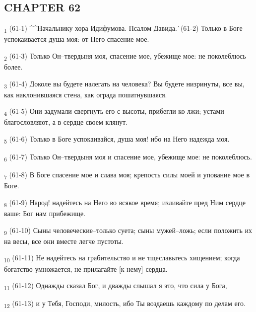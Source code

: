 \subsection{CHAPTER 62}
\begin{tcolorbox}
\textsubscript{1} (61-1) ^^Начальнику хора Идифумова. Псалом Давида.^^ (61-2) Только в Боге успокаивается душа моя: от Него спасение мое.
\end{tcolorbox}
\begin{tcolorbox}
\textsubscript{2} (61-3) Только Он--твердыня моя, спасение мое, убежище мое: не поколеблюсь более.
\end{tcolorbox}
\begin{tcolorbox}
\textsubscript{3} (61-4) Доколе вы будете налегать на человека? Вы будете низринуты, все вы, как наклонившаяся стена, как ограда пошатнувшаяся.
\end{tcolorbox}
\begin{tcolorbox}
\textsubscript{4} (61-5) Они задумали свергнуть его с высоты, прибегли ко лжи; устами благословляют, а в сердце своем клянут.
\end{tcolorbox}
\begin{tcolorbox}
\textsubscript{5} (61-6) Только в Боге успокаивайся, душа моя! ибо на Него надежда моя.
\end{tcolorbox}
\begin{tcolorbox}
\textsubscript{6} (61-7) Только Он--твердыня моя и спасение мое, убежище мое: не поколеблюсь.
\end{tcolorbox}
\begin{tcolorbox}
\textsubscript{7} (61-8) В Боге спасение мое и слава моя; крепость силы моей и упование мое в Боге.
\end{tcolorbox}
\begin{tcolorbox}
\textsubscript{8} (61-9) Народ! надейтесь на Него во всякое время; изливайте пред Ним сердце ваше: Бог нам прибежище.
\end{tcolorbox}
\begin{tcolorbox}
\textsubscript{9} (61-10) Сыны человеческие--только суета; сыны мужей--ложь; если положить их на весы, все они вместе легче пустоты.
\end{tcolorbox}
\begin{tcolorbox}
\textsubscript{10} (61-11) Не надейтесь на грабительство и не тщеславьтесь хищением; когда богатство умножается, не прилагайте [к нему] сердца.
\end{tcolorbox}
\begin{tcolorbox}
\textsubscript{11} (61-12) Однажды сказал Бог, и дважды слышал я это, что сила у Бога,
\end{tcolorbox}
\begin{tcolorbox}
\textsubscript{12} (61-13) и у Тебя, Господи, милость, ибо Ты воздаешь каждому по делам его.
\end{tcolorbox}
